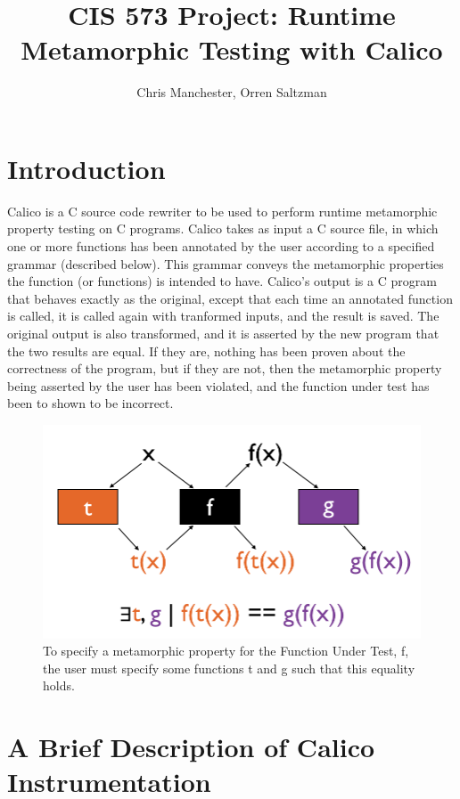 \documentclass[notitlepage]{article}
\author{Chris Manchester, Orren Saltzman}
\title{CIS 573 Project: Runtime Metamorphic Testing with Calico}
\begin{document}
\maketitle

\section{Introduction}

Calico is a C source code rewriter to be used to perform runtime metamorphic property testing on C programs. Calico takes as input a C source file, in which one or more functions has been annotated by the user according to a specified grammar (described below). This grammar conveys the metamorphic properties the function (or functions) is intended to have. Calico's output is a C program that behaves exactly as the original, except that each time an annotated function is called, it is called again with tranformed inputs, and the result is saved. The original output is also transformed, and it is asserted by the new program that the two results are equal. If they are, nothing has been proven about the correctness of the program, but if they are not, then the metamorphic property being asserted by the user has been violated, and the function under test has been to shown to be incorrect.

\begin{figure}[ht!]
\centering
\includegraphics[width=175mm]{calico_pic1_alternate.png}
\caption{To specify a metamorphic property for the Function Under Test, f, the user must specify some functions t and g such that this equality holds.}
\end{figure}

\section{A Brief Description of Calico Instrumentation}
\end{document}
